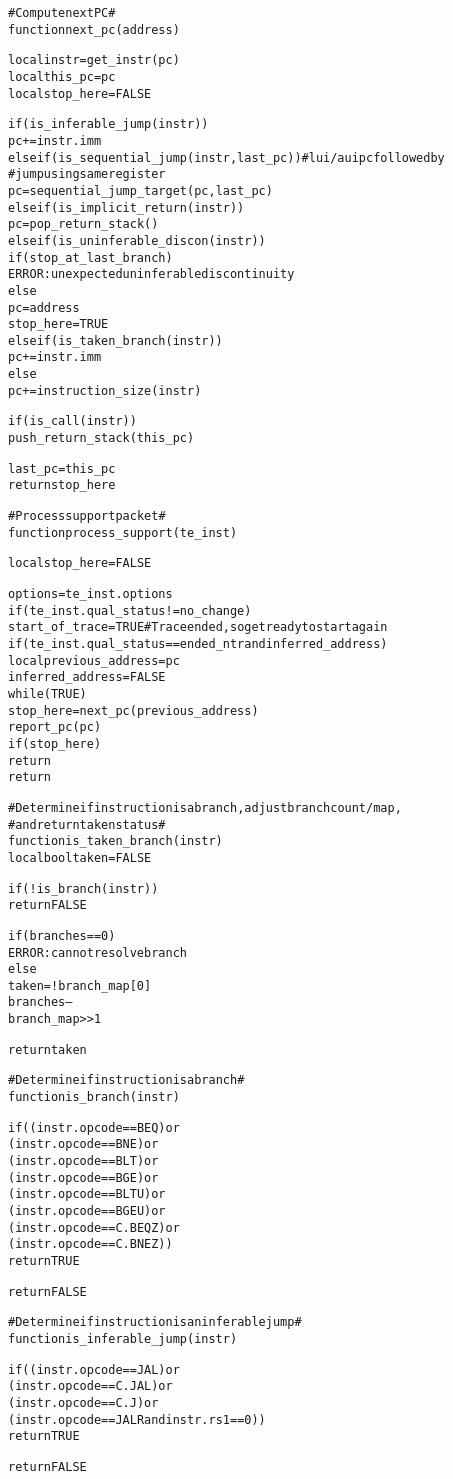 \begin{alltt}
# Compute next PC #
function next_pc (address)

  local instr     = get_instr(pc)
  local this_pc   = pc
  local stop_here = FALSE

  if (is_inferable_jump(instr))
    pc += instr.imm
  else if (is_sequential_jump(instr, last_pc)) # lui/auipc followed by
                                               #  jump using same register
    pc = sequential_jump_target(pc, last_pc)
  else if (is_implicit_return(instr))
    pc = pop_return_stack()
  else if (is_uninferable_discon(instr))
    if (stop_at_last_branch)
      ERROR: unexpected uninferable discontinuity
    else
      pc        = address
      stop_here = TRUE
  else if (is_taken_branch(instr))
    pc += instr.imm
  else
    pc += instruction_size(instr)

  if (is_call(instr))
    push_return_stack(this_pc)

  last_pc = this_pc
  return stop_here

# Process support packet #
function process_support (te_inst)

  local stop_here = FALSE

  options = te_inst.options
    if (te_inst.qual_status != no_change)
      start_of_trace = TRUE # Trace ended, so get ready to start again
    if (te_inst.qual_status == ended_ntr and inferred_address)
      local previous_address = pc
      inferred_address       = FALSE
      while (TRUE)
        stop_here = next_pc(previous_address)
        report_pc(pc)
        if (stop_here)
          return
    return
\end{alltt}

\pagebreak

\begin{alltt}
# Determine if instruction is a branch, adjust branch count/map,
#   and return taken status #
function is_taken_branch (instr)
  local bool taken = FALSE

  if (!is_branch(instr))
    return FALSE

  if (branches == 0)
    ERROR: cannot resolve branch
  else
    taken = !branch_map[0]
    branches--
    branch_map >> 1

  return taken

# Determine if instruction is a branch #
function is_branch (instr)

  if ((instr.opcode == BEQ)    or
      (instr.opcode == BNE)    or
      (instr.opcode == BLT)    or
      (instr.opcode == BGE)    or
      (instr.opcode == BLTU)   or
      (instr.opcode == BGEU)   or
      (instr.opcode == C.BEQZ) or
      (instr.opcode == C.BNEZ))
    return TRUE

  return FALSE

# Determine if instruction is an inferable jump #
function is_inferable_jump (instr)

  if ((instr.opcode == JAL)   or
      (instr.opcode == C.JAL) or
      (instr.opcode == C.J)   or
      (instr.opcode == JALR and instr.rs1 == 0))
    return TRUE

  return FALSE
\end{alltt}

